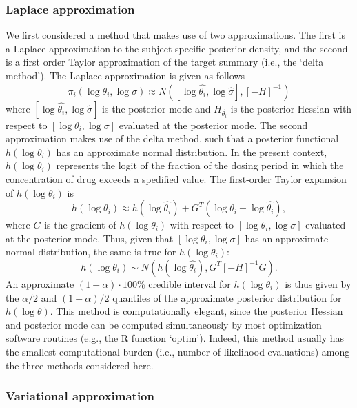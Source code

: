 \documentclass{article}
\begin{document}
\subsubsection{Laplace approximation}
We first considered a method that makes use of two approximations. The first is a Laplace approximation to the subject-specific posterior density, and the second is a first order Taylor approximation of the target summary (i.e., the `delta method'). The Laplace approximation is given as follows
\begin{displaymath}
\pi_i(\log \theta_i, \log \sigma) \approx N([\log \hat{\theta_i},\log \hat{\sigma}], [-H]^{-1})
\end{displaymath} 
\noindent where $[\log \hat{\theta_i},\log \hat{\sigma}]$ is the posterior mode and $H_{\hat{\theta_i}}$ is the posterior Hessian with respect to $[\log \theta_i, \log \sigma]$ evaluated at the posterior mode. The second approximation makes use of the delta method, such that a posterior functional $h(\log \theta_i)$ has an approximate normal distribution. In the present context, $h(\log \theta_i)$ represents the logit of the fraction of the dosing period in which the concentration of drug exceeds a spedified value. The first-order Taylor expansion of $h(\log \theta_i)$ is 
\begin{displaymath}
h(\log \theta_i) \approx  h(\log \hat{\theta_i}) + G^T(\log \theta_i - \log \hat{\theta_i}),
\end{displaymath}
\noindent where $G$ is the gradient of $h(\log \theta_i)$ with respect to $[\log \theta_i, \log \sigma]$ evaluated at the posterior mode. Thus, given that $[\log \theta_i, \log \sigma]$ has an approximate normal distribution, the same is true for $h(\log \theta_i)$:
\begin{displaymath}
h(\log \theta_i) \sim N(h(\log \hat{\theta_i}), G^T[-H]^{-1}G). 
\end{displaymath}
\noindent An approximate $(1-\alpha)\cdot 100$\% credible interval for $h(\log \theta_i)$ is thus given by the $\alpha/2$ and $(1-\alpha)/2$ quantiles of the approximate posterior distribution for $h(\log \theta)$. This method is computationally elegant, since the posterior Hessian and posterior mode can be computed simultaneously by most optimization software routines (e.g., the R function `optim'). Indeed, this method usually has the smallest computational burden (i.e., number of likelihood evaluations) among the three methods considered here.

\subsubsection{Variational approximation}
\end{document}
